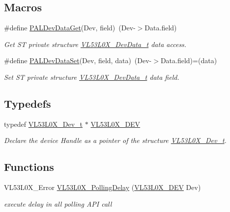 \subsection*{Macros}
\begin{DoxyCompactItemize}
\item 
\#define \hyperlink{group__VL53L0X__platform__group_ga21f3ef1fbe84f5cf77d989c95f21ad0a}{P\+A\+L\+Dev\+Data\+Get}(Dev,  field)~(Dev-\/$>$Data.\+field)
\begin{DoxyCompactList}\small\item\em Get ST private structure {\itshape \hyperlink{structVL53L0X__DevData__t}{V\+L53\+L0\+X\+\_\+\+Dev\+Data\+\_\+t}} data access. \end{DoxyCompactList}\item 
\#define \hyperlink{group__VL53L0X__platform__group_ga7d67a50d6fbce3ffdb71b4b3f7cbdf39}{P\+A\+L\+Dev\+Data\+Set}(Dev,  field,  data)~(Dev-\/$>$Data.\+field)=(data)
\begin{DoxyCompactList}\small\item\em Set ST private structure {\itshape \hyperlink{structVL53L0X__DevData__t}{V\+L53\+L0\+X\+\_\+\+Dev\+Data\+\_\+t}} data field. \end{DoxyCompactList}\end{DoxyCompactItemize}
\subsection*{Typedefs}
\begin{DoxyCompactItemize}
\item 
\mbox{\label{group__VL53L0X__platform__group_ga2d6405308b1dd524b462f1b8fb97d167}} 
typedef \hyperlink{structVL53L0X__Dev__t}{V\+L53\+L0\+X\+\_\+\+Dev\+\_\+t} $\ast$ \hyperlink{group__VL53L0X__platform__group_ga2d6405308b1dd524b462f1b8fb97d167}{V\+L53\+L0\+X\+\_\+\+D\+EV}
\begin{DoxyCompactList}\small\item\em Declare the device Handle as a pointer of the structure {\itshape \hyperlink{structVL53L0X__Dev__t}{V\+L53\+L0\+X\+\_\+\+Dev\+\_\+t}}. \end{DoxyCompactList}\end{DoxyCompactItemize}
\subsection*{Functions}
\begin{DoxyCompactItemize}
\item 
V\+L53\+L0\+X\+\_\+\+Error \hyperlink{group__VL53L0X__platform__group_ga08518599bfc34a2c943dcd5fa14072de}{V\+L53\+L0\+X\+\_\+\+Polling\+Delay} (\hyperlink{group__VL53L0X__platform__group_ga2d6405308b1dd524b462f1b8fb97d167}{V\+L53\+L0\+X\+\_\+\+D\+EV} Dev)
\begin{DoxyCompactList}\small\item\em execute delay in all polling A\+PI call \end{DoxyCompactList}\end{DoxyCompactItemize}


